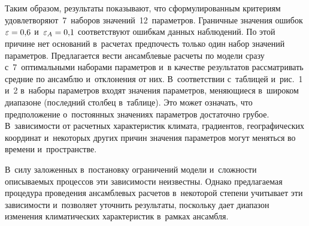 \begin{multicols}{2}
\begin{figure*}[b] %
\vspace*{3pt}
\begin{center}
\mbox{%
\epsfxsize=145.144mm
}
\end{center}
\vspace*{-12pt}
  \vspace*{9pt}
\begin{center}
\mbox{%
\epsfxsize=145.144mm
}
\end{center}
\vspace*{-12pt}
\end{figure*}

Таким 
образом, результаты показывают, что сформулированным критериям 
удовлетворяют~7~наборов значений~12~па\-ра\-мет\-ров. Граничные значения 
ошибок $\varepsilon\hm=0{,}6$ и~$\varepsilon_A\hm= 0{,}1$ соответствуют 
ошибкам данных наблюдений. По этой причине нет оснований в~расчетах 
предпочесть только один набор значений параметров. Предлагается вести 
ансамблевые расчеты по модели сразу с~7~оптимальными наборами 
параметров и~в качестве результатов
 рассматривать средние по ансамблю 
и~отклонения от них. В~соответствии с~таблицей и~рис.~1 и~2 в~наборы 
параметров входят значения па\-ра\-мет\-ров, меняющиеся в~широком диапазоне 
(последний стол\-бец в~таб\-ли\-це). Это может означать, что предположение 
о~постоянных значениях параметров достаточно
 грубое. В~зависимости от 
расчетных характеристик климата, градиентов, географических координат 
и~некоторых других причин значения параметров могут меняться во времени 
и~пространстве. 

В~силу заложенных в~постановку ограничений модели 
и~сложности описываемых процессов эти зависимости неизвестны. Однако 
пред\-ла\-га\-емая процедура проведения ансамблевых расчетов в~некоторой 
степени учитывает эти зависимости и~позволяет уточнить результаты, 
поскольку дает диапазон изменения климатических характеристик в~рамках 
ансамбля. 

\begin{figure*} %
\vspace*{1pt}
\begin{center}
\mbox{%
\epsfxsize=164.593mm
}
\end{center}
\vspace*{-9pt}
\end{figure*}


\end{multicols}
